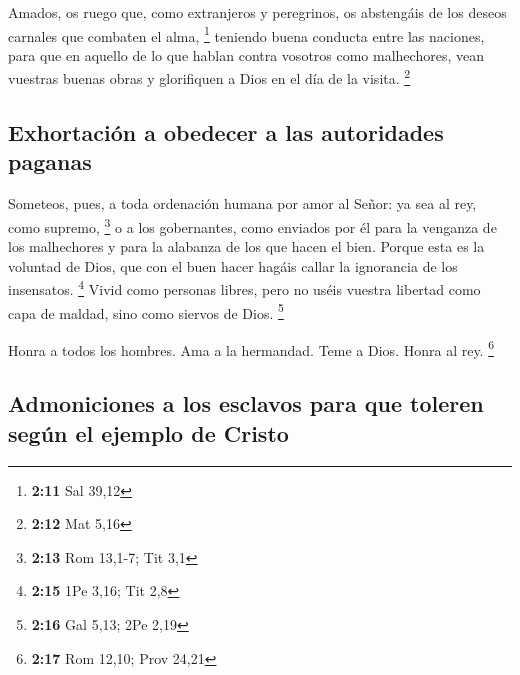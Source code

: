  Amados, os ruego que, como extranjeros y peregrinos, os
abstengáis de los deseos carnales que combaten el alma, \footnote{\textbf{2:11}
  Sal 39,12}  teniendo buena conducta entre las naciones,
para que en aquello de lo que hablan contra vosotros como malhechores,
vean vuestras buenas obras y glorifiquen a Dios en el día de la visita.
\footnote{\textbf{2:12} Mat 5,16}

\hypertarget{exhortaciuxf3n-a-obedecer-a-las-autoridades-paganas}{%
\subsection{Exhortación a obedecer a las autoridades
paganas}\label{exhortaciuxf3n-a-obedecer-a-las-autoridades-paganas}}

 Someteos, pues, a toda ordenación humana por amor al
Señor: ya sea al rey, como supremo, \footnote{\textbf{2:13} Rom 13,1-7;
  Tit 3,1}  o a los gobernantes, como enviados por él
para la venganza de los malhechores y para la alabanza de los que hacen
el bien.  Porque esta es la voluntad de Dios, que con el
buen hacer hagáis callar la ignorancia de los insensatos. \footnote{\textbf{2:15}
  1Pe 3,16; Tit 2,8}  Vivid como personas libres, pero no
uséis vuestra libertad como capa de maldad, sino como siervos de Dios.
\footnote{\textbf{2:16} Gal 5,13; 2Pe 2,19}

 Honra a todos los hombres. Ama a la hermandad. Teme a
Dios. Honra al rey. \footnote{\textbf{2:17} Rom 12,10; Prov 24,21}

\hypertarget{admoniciones-a-los-esclavos-para-que-toleren-seguxfan-el-ejemplo-de-cristo}{%
\subsection{Admoniciones a los esclavos para que toleren según el
ejemplo de
Cristo}\label{admoniciones-a-los-esclavos-para-que-toleren-seguxfan-el-ejemplo-de-cristo}}

